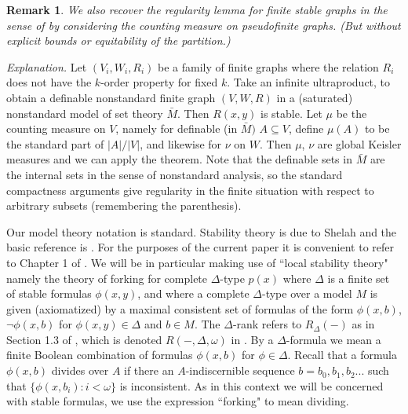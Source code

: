 \documentclass[12pt]{article}
\newtheorem{Remark}[Theorem]{Remark}
\begin{document}
\begin{Remark} We also recover the regularity lemma for finite stable graphs in the sense of \cite{MS} by considering the counting measure on  pseudofinite graphs. (But without explicit  bounds or equitability of the partition.)
\end{Remark}
\noindent
{\em Explanation.}  Let $(V_{i},W_{i}, R_{i})$ be a family of finite graphs where the relation $R_{i}$ does not have the $k$-order property for fixed $k$. Take an infinite ultraproduct, to obtain a definable nonstandard finite graph $(V,W,R)$ in a (saturated) nonstandard model of set theory ${\bar M}$. Then $R(x,y)$ is stable. 
Let $\mu$ be the counting measure on $V$, namely for definable (in ${\bar M})$ $A\subseteq V$, define $\mu(A)$ to be the standard part of $|A|/|V|$, and likewise for $\nu$ on $W$. Then $\mu$, $\nu$ are global Keisler measures and we can apply the theorem.  Note that the definable sets in ${\bar M}$ are the internal sets in the sense of nonstandard analysis, so the standard compactness arguments give regularity in the finite situation with respect to arbitrary subsets (remembering the parenthesis). 

\vspace{2mm}
\noindent
Our model theory notation is standard. Stability theory is due to Shelah and the basic reference is \cite{Shelah}. For the purposes of the current paper it is convenient to refer to Chapter 1 of \cite{Pillay}. We will be in particular making use of ``local stability theory" namely the theory of forking for complete $\Delta$-type $p(x)$ where $\Delta$ is a finite set of stable formulas $\phi(x,y)$, and where a complete $\Delta$-type over a model $M$ is given (axiomatized)  by a maximal consistent set of formulas of the form $\phi(x,b)$, $\neg \phi(x,b)$ for $\phi(x,y)\in \Delta$ and $b\in M$.  The $\Delta$-rank refers to $R_{\Delta}(-)$ as in Section 1.3 of \cite{Pillay}, which is denoted $R(-,\Delta, \omega)$ in \cite{Shelah}. By a $\Delta$-formula we mean a finite Boolean combination of formulas $\phi(x,b)$ for $\phi\in \Delta$.   Recall that a formula $\phi(x,b)$ divides over $A$ if there an $A$-indiscernible sequence $b = b_{0}, b_{1}, b_{2}...$ such that $\{\phi(x,b_{i}):i < \omega\}$ is inconsistent. As in this context we will be concerned with stable formulas, we use the expression ``forking" to mean dividing.
\end{document}
